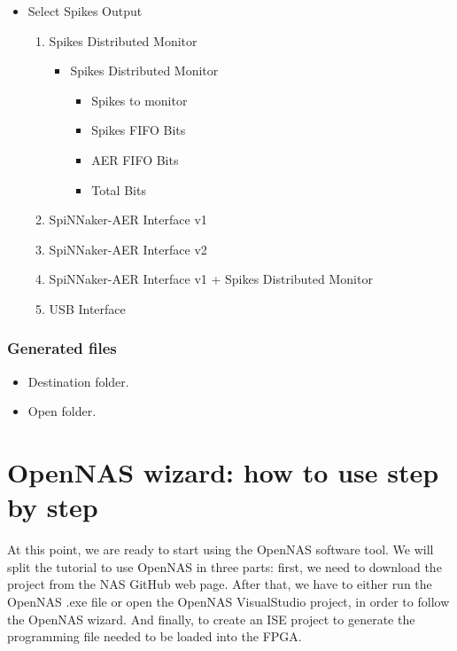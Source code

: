 \begin{itemize}
    \item Select Spikes Output
        \begin{enumerate}
            \item Spikes Distributed Monitor
                \begin{itemize}
                    \item Spikes Distributed Monitor
                        \begin{itemize}
                            \item Spikes to monitor
                            \item Spikes FIFO Bits
                            \item AER FIFO Bits
                            \item Total Bits
                        \end{itemize}
                \end{itemize}
            \item SpiNNaker-AER Interface v1
            
            \item SpiNNaker-AER Interface v2
            
            \item SpiNNaker-AER Interface v1 + Spikes Distributed Monitor
            
            \item USB Interface
            
        \end{enumerate}
\end{itemize}

\subsubsection{Generated files}
\begin{itemize}
    \item Destination folder.
    \item Open folder.
\end{itemize}

\newpage
\section{OpenNAS wizard: how to use step by step}
\label{sec:Steps}

At this point, we are ready to start using the OpenNAS software tool. We will split the tutorial to use OpenNAS in three parts: first, we need to download the project from the NAS GitHub web page. After that, we have to either run the OpenNAS .exe file or open the OpenNAS VisualStudio project, in order to follow the OpenNAS wizard. And finally, to create an ISE project to generate the programming file needed to be loaded into the FPGA. 

